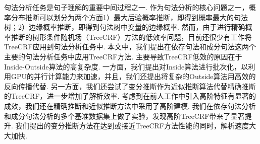 
\begin{cabstract}
  句法分析任务是句子理解的重要中间过程之一.
  作为句法分析的核心问题之一，概率分布推断可以划分为两个方面1）最大后验概率推断，即得到概率最大的句法树；2）边缘概率推断，即得到句法树中变量的边缘概率.
  然而，由于进行精确概率推断的树形条件随机场（TreeCRF）方法的低效率问题，目前还很少有工作将TreeCRF应用到句法分析任务中.
  本文中，我们提出在依存句法和成分句法这两个主要的句法分析任务中应用TreeCRF方法.
  主要导致TreeCRF低效的原因在于Inside-Outside算法的高复杂度.
  一方面，我们提出对Inside算法进行批次化，以利用GPU的并行计算能力来加速，并且，我们还提出将复杂的Outside算法用高效的反向传播代替.
  另一方面，我们还尝试了变分推断作为近似推断算法代替精确推断的TreeCRF，进一步增加了解析效率.
  考虑到在前人工作中引入高阶特征有显著的成效，我们还在精确推断和近似推断方法中采用了高阶建模.
  我们在依存句法分析和成分句法分析的多个基准数据集上做了实验，发现高阶TreeCRF带来了显著提升.
  我们提出的变分推断方法在达到或接近TreeCRF方法性能的同时，解析速度大大加快.


\end{cabstract}
